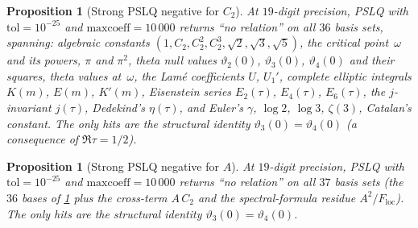\documentclass[11pt,a4paper]{article}
\theoremstyle{plain}
\newtheorem{proposition}[theorem]{Proposition}
\theoremstyle{definition}
\theoremstyle{remark}
\newcommand{\vt}[1]{\vartheta_{#1}}     %
\begin{document}
\begin{proposition}[Strong PSLQ negative for $C_2$]
\label{prop:pslq-C2-neg}
At $19$-digit precision, PSLQ with $\mathrm{tol} = 10^{-25}$
and $\mathrm{maxcoeff} = 10\,000$ returns \textup{``no relation''}
on all $36$ basis sets, spanning:
algebraic constants $(1, C_2, C_2^2, C_2^3, \sqrt{2},
\sqrt{3}, \sqrt{5})$,
the critical point~$\omega$ and its powers,
$\pi$ and $\pi^2$,
theta null values $\vt{2}(0)$, $\vt{3}(0)$, $\vt{4}(0)$
and their squares,
theta values at~$\omega$,
the Lam\'e coefficients $U$, $U_1'$,
complete elliptic integrals $K(m)$, $E(m)$, $K'(m)$,
Eisenstein series $E_2(\tau)$, $E_4(\tau)$, $E_6(\tau)$,
the $j$-invariant $j(\tau)$,
Dedekind's $\eta(\tau)$,
and Euler's $\gamma$, $\log 2$, $\log 3$,
$\zeta(3)$, Catalan's constant.
The only hits are the structural identity
$\vt{3}(0) = \vt{4}(0)$
(a consequence of $\Re \tau = 1/2$).
\end{proposition}

\begin{proposition}[Strong PSLQ negative for $A$]
\label{prop:pslq-neg}
At $19$-digit precision, PSLQ with $\mathrm{tol} = 10^{-25}$
and $\mathrm{maxcoeff} = 10\,000$ returns \textup{``no relation''}
on all $37$ basis sets (the $36$ bases of
\cref{prop:pslq-C2-neg} plus the cross-term $A \,C_2$
and the spectral-formula residue $A^2 / F_{\mathrm{loc}}$).
The only hits are the structural identity
$\vt{3}(0) = \vt{4}(0)$.
\end{proposition}
\end{document}
